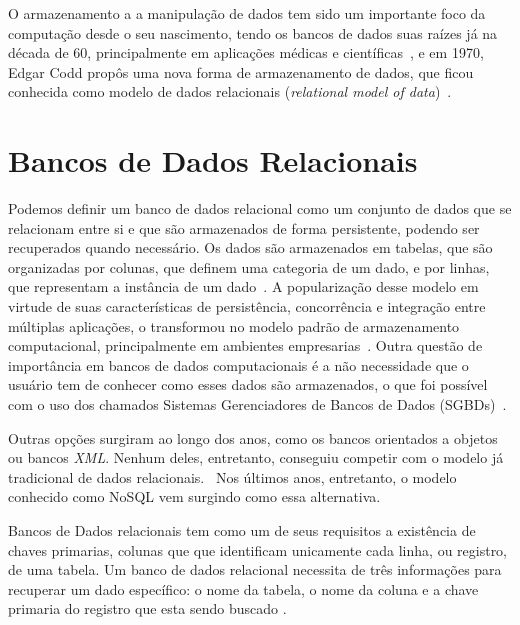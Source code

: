 O armazenamento a a manipulação de dados tem sido um importante foco da computação desde o seu nascimento, tendo os bancos de dados suas raízes já na década de 60, principalmente em aplicações médicas e científicas~\cite{neufeld1986database}, e em 1970, Edgar Codd propôs uma nova forma de armazenamento de dados, que ficou conhecida como modelo de dados relacionais (\emph{relational model of data})~\cite{codd1970relational}. 

\section{Bancos de Dados Relacionais}
    Podemos definir um banco de dados relacional como um conjunto de dados que se relacionam entre si e que são armazenados de forma persistente, podendo ser recuperados quando necessário. Os dados são armazenados em tabelas, que são organizadas por colunas, que definem uma categoria de um dado, e por linhas, que representam a instância de um dado~\cite{leavitt2010nosql}. A popularização desse modelo em virtude de suas características de persistência, concorrência e integração entre múltiplas aplicações, o transformou no modelo padrão de armazenamento computacional, principalmente em ambientes empresarias~\cite{pramod}. Outra questão de importância em bancos de dados computacionais é a não necessidade que o usuário tem de conhecer como esses dados são armazenados, o que foi possível com o uso dos chamados Sistemas Gerenciadores de Bancos de Dados (SGBDs)~\cite{jan}.
    
    Outras opções surgiram ao longo dos anos, como os bancos orientados a objetos ou bancos \emph{XML}. Nenhum deles, entretanto, conseguiu competir com o modelo já tradicional de dados relacionais.~\cite{pramod} Nos últimos anos, entretanto, o modelo conhecido como NoSQL vem surgindo como essa alternativa.
    
    Bancos de Dados relacionais tem como um de seus requisitos a existência de chaves primarias, colunas que que identificam unicamente cada linha, ou registro, de uma tabela. Um banco de dados relacional necessita de três informações para recuperar um dado específico: o nome da tabela, o nome da coluna e a chave primaria do registro que esta sendo buscado \cite{jan}.
    
    

